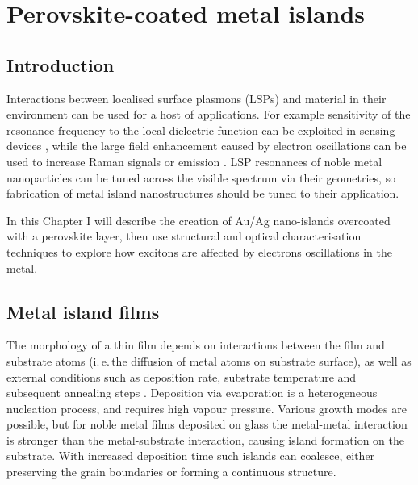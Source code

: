
\chapter{Perovskite-coated metal islands}

\graphicspath{{Chapter6/Figures/}}

\section{Introduction}
Interactions between localised surface plasmons (LSPs) and material in their environment can be used for a host of applications. For example sensitivity of the resonance frequency to the local dielectric function can be exploited in sensing devices \cite{Jensen2000, Xu2004, Malinsky2001, Royer1987}, while the large field enhancement caused by electron oscillations can be used to increase Raman signals \cite{Cade2009, Olson2001, Talley2005} or emission \cite{Toftegaard2011, Cho2010, Reboud2013, Blanco2004}. LSP resonances of noble metal nanoparticles can be tuned across the visible spectrum via their geometries, so fabrication of metal island nanostructures should be tuned to their application.

In this Chapter I will describe the creation of Au/Ag nano-islands overcoated with a perovskite layer, then use structural and optical characterisation techniques to explore how excitons are affected by electrons oscillations in the metal.

\section{Metal island films}
The morphology of a thin film depends on interactions between the film and substrate atoms (i.\,e.\,the diffusion of metal atoms on substrate surface), as well as external conditions such as deposition rate, substrate temperature and subsequent annealing steps \cite{Kaiser2002}. Deposition via evaporation is a heterogeneous nucleation process, and requires high vapour pressure. Various growth modes are possible, but for noble metal films deposited on glass the metal-metal interaction is stronger than the metal-substrate interaction, causing island formation on the substrate. With increased deposition time such islands can coalesce, either preserving the grain boundaries or forming a continuous structure.

